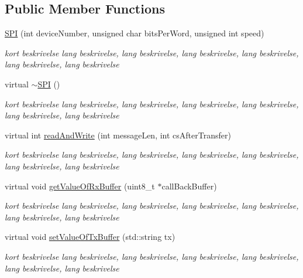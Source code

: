\subsection*{Public Member Functions}
\begin{DoxyCompactItemize}
\item 
\hyperlink{classSPI_aa4928d013558671e0622e7320414ab77}{S\+PI} (int device\+Number, unsigned char bits\+Per\+Word, unsigned int speed)
\begin{DoxyCompactList}\small\item\em kort beskrivelse lang beskrivelse, lang beskrivelse, lang beskrivelse, lang beskrivelse, lang beskrivelse, lang beskrivelse \end{DoxyCompactList}\item 
virtual \hyperlink{classSPI_a6babebf1ea3e8ff0330f43a3e2312ac4}{$\sim$\+S\+PI} ()
\begin{DoxyCompactList}\small\item\em kort beskrivelse lang beskrivelse, lang beskrivelse, lang beskrivelse, lang beskrivelse, lang beskrivelse, lang beskrivelse \end{DoxyCompactList}\item 
virtual int \hyperlink{classSPI_ac50b3f5491e294aef6806f4e131cbd0e}{read\+And\+Write} (int message\+Len, int cs\+After\+Transfer)
\begin{DoxyCompactList}\small\item\em kort beskrivelse lang beskrivelse, lang beskrivelse, lang beskrivelse, lang beskrivelse, lang beskrivelse, lang beskrivelse \end{DoxyCompactList}\item 
virtual void \hyperlink{classSPI_ad468d421e9c82453957c5ee7ea7d5b9d}{get\+Value\+Of\+Rx\+Buffer} (uint8\+\_\+t $\ast$call\+Back\+Buffer)
\begin{DoxyCompactList}\small\item\em kort beskrivelse lang beskrivelse, lang beskrivelse, lang beskrivelse, lang beskrivelse, lang beskrivelse, lang beskrivelse \end{DoxyCompactList}\item 
virtual void \hyperlink{classSPI_ad770b7e8e8ae678a2c3c5e2d2be6887a}{set\+Value\+Of\+Tx\+Buffer} (std\+::string tx)
\begin{DoxyCompactList}\small\item\em kort beskrivelse lang beskrivelse, lang beskrivelse, lang beskrivelse, lang beskrivelse, lang beskrivelse, lang beskrivelse \end{DoxyCompactList}\item 

\end{DoxyCompactItemize}
